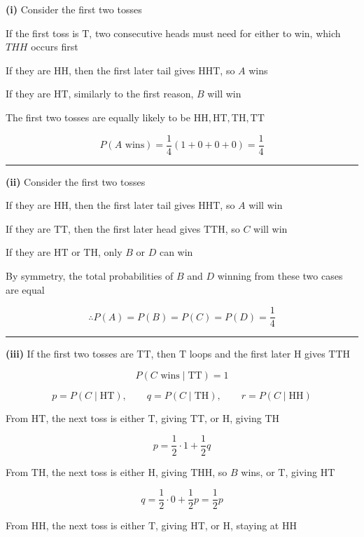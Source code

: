 \documentclass[12pt]{article}
\begin{document}
\newcommand{\ds}{\displaystyle}


\textbf{(i)} Consider the first two tosses

If the first toss is $\mathrm{T}$, two consecutive heads must need for either to win, which $THH$ occurs first

If they are $\mathrm{HH}$, then the first later tail gives $\mathrm{HHT}$, so $A$ wins

If they are $\mathrm{HT}$, similarly to the first reason, $B$ will win

The first two tosses are equally likely to be $\mathrm{HH},\mathrm{HT},\mathrm{TH},\mathrm{TT}$

$$P(A\text{ wins})=\frac14(1+0+0+0)=\boxed{\frac14}$$

\bigskip\hrule\bigskip

\textbf{(ii)} Consider the first two tosses

If they are $\mathrm{HH}$, then the first later tail gives $\mathrm{HHT}$, so $A$ will win

If they are $\mathrm{TT}$, then the first later head gives $\mathrm{TTH}$, so $C$ will win

If they are $\mathrm{HT}$ or $\mathrm{TH}$, only $B$ or $D$ can win

By symmetry, the total probabilities of $B$ and $D$ winning from these two cases are equal

$$\therefore \boxed{P(A)=P(B)=P(C)=P(D)=\frac14}$$


\bigskip\hrule\bigskip

\textbf{(iii)} If the first two tosses are $\mathrm{TT}$, then $\mathrm{T}$ loops and the first later $\mathrm{H}$ gives $\mathrm{TTH}$

$$\boxed{P(C\text{ wins}\mid \mathrm{TT})=1}$$

$$p=P(C\mid \mathrm{HT}),\qquad q=P(C\mid \mathrm{TH}),\qquad r=P(C\mid \mathrm{HH})$$

From $\mathrm{HT}$, the next toss is either $\mathrm{T}$, giving $\mathrm{TT}$, or $\mathrm{H}$, giving $\mathrm{TH}$

$$p=\frac12\cdot1+\frac12q$$

From $\mathrm{TH}$, the next toss is either $\mathrm{H}$, giving $\mathrm{THH}$, so $B$ wins, or $\mathrm{T}$, giving $\mathrm{HT}$

$$q=\frac12\cdot0+\frac12p=\frac12p$$

From $\mathrm{HH}$, the next toss is either $\mathrm{T}$, giving $\mathrm{HT}$, or $\mathrm{H}$, staying at $\mathrm{HH}$
\end{document}
